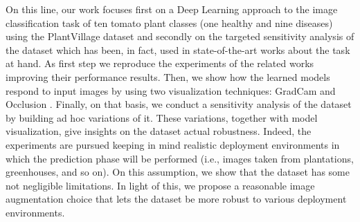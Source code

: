 On this line, our work focuses first on a Deep Learning approach to the image classification task of ten tomato plant classes (one healthy and nine diseases) using the PlantVillage dataset \cite{PlantVillage} and secondly on the targeted sensitivity analysis of the dataset which has been, in fact, used in state-of-the-art works \cite{ref11, ref10} about the task at hand. As first step we reproduce the experiments of the related works improving their performance results. Then, we show how the learned models respond to input images by using two visualization techniques: GradCam \cite{ref12} and Occlusion \cite{ref13}. Finally, on that basis, we conduct a sensitivity analysis of the dataset by building ad hoc variations of it. These variations, together with model visualization, give insights on the dataset actual robustness. Indeed, the experiments are pursued keeping in mind realistic deployment environments in which the prediction phase will be performed (i.e., images taken from plantations, greenhouses, and so on). On this assumption, we show that the dataset has some not negligible limitations. In light of this, we propose a reasonable image augmentation choice that lets the dataset be more robust to various deployment environments.